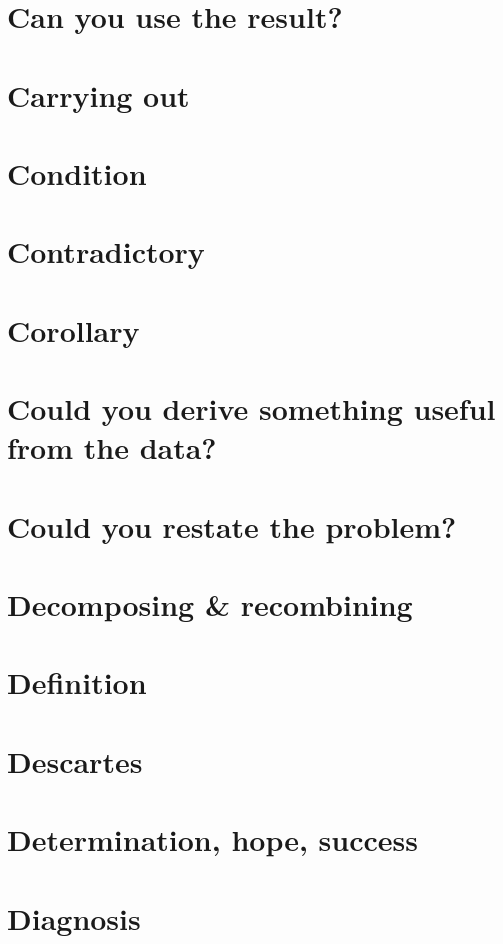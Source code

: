 \documentclass[oneside]{book}
\numberwithin{equation}{section}
\begin{document}
\section*{Can you use the result?}

\section*{Carrying out}

\section*{Condition}

\section*{Contradictory}

\section*{Corollary}

\section*{Could you derive something useful from the data?}

\section*{Could you restate the problem?}

\section*{Decomposing \& recombining}

\section*{Definition}

\section*{Descartes}

\section*{Determination, hope, success}

\section*{Diagnosis}
\end{document}
